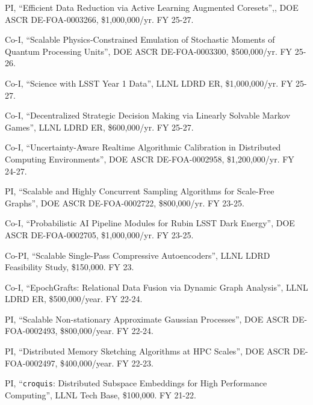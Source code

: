 \begin{innerlist}

  \item PI,
  ``Efficient Data Reduction via Active Learning Augmented Coresets'',,
  DOE ASCR DE-FOA-0003266,
  \$1,000,000/yr.
  FY 25-27.

  \item Co-I,
  ``Scalable Physics-Constrained Emulation of Stochastic Moments of Quantum Processing Units'',
  DOE ASCR DE-FOA-0003300,
  \$500,000/yr.
  FY 25-26.

  \item Co-I,
  ``Science with LSST Year 1 Data'',
  LLNL LDRD ER,
  \$1,000,000/yr.
  FY 25-27.

  \item Co-I,
  ``Decentralized Strategic Decision Making via Linearly Solvable Markov Games'',
  LLNL LDRD ER,
  \$600,000/yr.
  FY 25-27.

  \item Co-I,
  ``Uncertainty-Aware Realtime Algorithmic Calibration in Distributed Computing Environments'',
  DOE ASCR DE-FOA-0002958,
  \$1,200,000/yr.
  FY 24-27.

  \item PI,
  ``Scalable and Highly Concurrent Sampling Algorithms for Scale-Free Graphs'',
  DOE ASCR DE-FOA-0002722,
  \$800,000/yr.
  FY 23-25.

  \item Co-I,
  ``Probabilistic AI Pipeline Modules for Rubin LSST Dark Energy'',
  DOE ASCR DE-FOA-0002705,
  \$1,000,000/yr.
  FY 23-25.

  \item Co-PI,
  ``Scalable Single-Pass Compressive Autoencoders'',
  LLNL LDRD Feasibility Study,
  \$150,000.
  FY 23.

  \item Co-I,
  ``EpochGrafts: Relational Data Fusion via Dynamic Graph Analysis'',
  LLNL LDRD ER,
  \$500,000/year.
  FY 22-24.

  \item PI,
  ``Scalable Non-stationary Approximate Gaussian Processes'',
  DOE ASCR DE-FOA-0002493,
  \$800,000/year.
  FY 22-24.

  \item PI,
  ``Distributed Memory Sketching Algorithms at HPC Scales'',
  DOE ASCR DE-FOA-0002497,
  \$400,000/year.
  FY 22-23.

  \item PI,
  ``\texttt{croquis}: Distributed Subspace Embeddings for High Performance Computing'',
  LLNL Tech Base,
  \$100,000.
  FY 21-22.

\end{innerlist}
